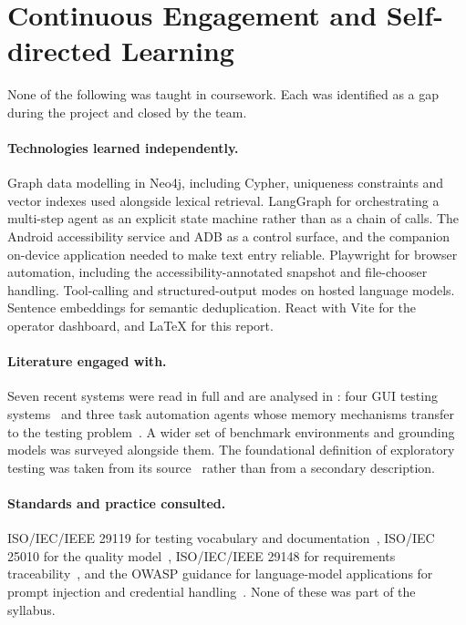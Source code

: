 \section{Continuous Engagement and Self-directed Learning}
\label{sec:lessons}

None of the following was taught in coursework. Each was identified as a gap
during the project and closed by the team.

\paragraph{Technologies learned independently.} Graph data modelling in Neo4j,
including Cypher, uniqueness constraints and vector indexes used alongside
lexical retrieval. LangGraph for orchestrating a multi-step agent as an explicit
state machine rather than as a chain of calls. The Android accessibility service
and ADB as a control surface, and the companion on-device application needed to
make text entry reliable. Playwright for browser automation, including the
accessibility-annotated snapshot and file-chooser handling. Tool-calling and
structured-output modes on hosted language models. Sentence embeddings for
semantic deduplication. React with Vite for the operator dashboard, and \LaTeX{}
for this report.

\paragraph{Literature engaged with.} Seven recent systems were read in full and
are analysed in : four GUI testing
systems~\cite{gptdroid,droidagent,auitestagent,xuatcopilot} and three task
automation agents whose memory mechanisms transfer to the testing
problem~\cite{autodroid,appagent,appagentx}. A wider set of benchmark
environments and grounding models was surveyed alongside them. The foundational
definition of exploratory testing was taken from its
source~\cite{kaner} rather than from a secondary description.

\paragraph{Standards and practice consulted.} ISO/IEC/IEEE 29119 for testing
vocabulary and documentation~\cite{iso29119}, ISO/IEC 25010 for the quality
model~\cite{iso25010}, ISO/IEC/IEEE 29148 for requirements
traceability~\cite{iso29148}, and the OWASP guidance for language-model
applications for prompt injection and credential
handling~\cite{owaspllm}. None of these was part of the syllabus.

